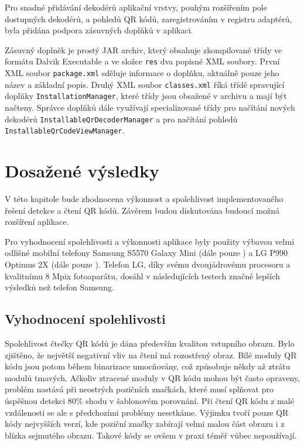 Pro snadné přidávání dekodérů aplikační vrstvy, pouhým rozšířením pole
dostupných dekodérů, a pohledů QR kódů, zaregistrováním v registru adaptérů,
byla přidána podpora zásuvných doplňků v aplikaci.

Zásuvný doplněk je prostý JAR archiv, který obsahuje zkompilované třídy ve
formátu Dalvik Executable a ve složce \texttt{res} dva popisné XML soubory.
První XML soubor \texttt{package.xml} sděluje informace o doplňku, aktuálně pouze jeho
název a základní popis. Druhý XML soubor \texttt{classes.xml} říká třídě
spravující doplňky \texttt{InstallationManager}, které třídy jsou obsažené v
archivu a mají být načteny. Správce doplňků dále využívají specializované třídy
pro načítání nových dekodérů \texttt{InstallableQrDecoderManager} a pro načítání
pohledů \texttt{InstallableQrCodeViewManager}.


\chapter{Dosažené výsledky}
\label{vysledky}

V této kapitole bude zhodnocena výkonnost a spolehlivost implementovaného
řešení detekce a čtení QR kódů. Závěrem budou diskutována budoucí možná
rozšíření aplikace.

Pro vyhodnocení spolehlivosti a výkonnosti aplikace byly použity výbavou velmi
odlišné mobilní telefony Samsung S5570 Galaxy Mini (dále pouze 
) a LG P990 Optimus 2X (dále pouze ). Telefon LG,
díky svému dvoujádrovému procesoru a kvalitnímu 8 Mpix fotoaparátu, dosáhl v
následujících testech značně lepších výsledků než telefon Samsung.

\section{Vyhodnocení spolehlivosti}
\label{vyhodnoceniSpolehlivost}

Spolehlivost čtečky QR kódů je dána především kvalitou vstupního obrazu. Bylo
zjištěno, že největší negativní vliv na čtení má rozostřený obraz. Bílé moduly
QR kódu jsou potom během binarizace umocňovány, což způsobuje někdy až ztrátu
modulů tmavých. Ačkoliv ztracené moduly v QR kódu mohou být často opraveny,
problém nastává při neostrých pozičních značkách, které musí splňovat pro
úspěšnou detekci 80\% shodu v šablonovém porovnání. Při čtení QR kódu z malé
vzdálenosti se ale s předchozími problémy nesetkáme. Výjimku tvoří pouze QR
kódy nejvyšších verzí, kde poziční značky zabírají velmi malou část obrazu i z
blízka sejmutého obrazu. Takové kódy se ovšem v praxi téměř vůbec nepoužívají.

